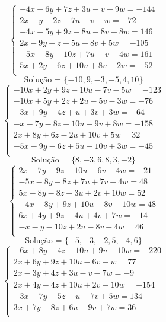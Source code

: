 \documentclass[12pt,oneside,a4paper]{article}
\begin{document}
\vspace{\baselineskip}
\begin{equation*}
\begin{cases}
-4x-6y+7z+3u-v-9w=-144 \\
2x-y-2z+7u-v-w=-72 \\
-4x+5y+9z-8u-8v+8w=146 \\
2x-9y-z+5u-8v+5w=-105 \\
-5x+8y-10z+7u+v+4w=161 \\
5x+2y-6z+10u+8v-2w=-52 \\
\end{cases}
\end{equation*}
\begin{equation*}
\text{Solução = }\{-10,9,-3,-5,4,10\}
\end{equation*}
\vspace{\baselineskip}
\begin{equation*}
\begin{cases}
-10x+2y+9z-10u-7v-5w=-123 \\
-10x+5y+2z+2u-5v-3w=-76 \\
-3x+9y-4z+u+3v+3w=-64 \\
-x-7y-8z-10u-9v+8w=-158 \\
2x+8y+6z-2u+10v+5w=32 \\
-5x-9y-6z+5u-10v+3w=-45 \\
\end{cases}
\end{equation*}
\begin{equation*}
\text{Solução = }\{8,-3,6,8,3,-2\}
\end{equation*}
\vspace{\baselineskip}
\begin{equation*}
\begin{cases}
2x-7y-9z-10u-6v-4w=-21 \\
-5x-8y-8z+7u+7v-4w=48 \\
5x-8y-8z-3u+2v+10w=52 \\
-4x-8y+9z+10u-8v-10w=48 \\
6x+4y+9z+4u+4v+7w=-14 \\
-x-y-10z+2u-8v-4w=46 \\
\end{cases}
\end{equation*}
\begin{equation*}
\text{Solução = }\{-5,-3,-2,5,-4,6\}
\end{equation*}
\vspace{\baselineskip}
\begin{equation*}
\begin{cases}
-6x+8y-4z-10u+9v-10w=-220 \\
2x+6y+9z+10u-6v-w=77 \\
2x-3y+4z+3u-v-7w=-9 \\
2x+4y-4z+10u+2v-10w=-154 \\
-3x-7y-5z-u-7v+5w=134 \\
3x+7y-8z+6u-9v+7w=36 \\
\end{cases}
\end{equation*}
\end{document}
